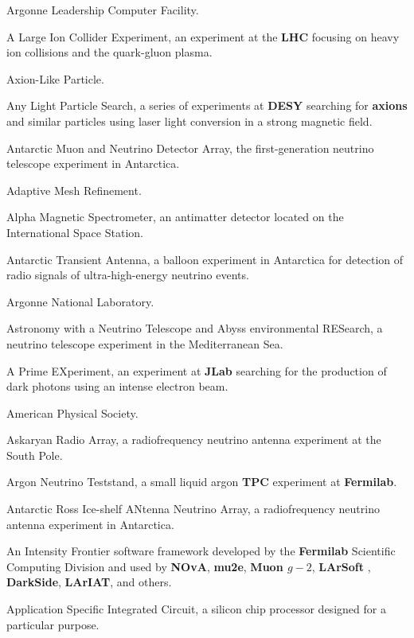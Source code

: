  Argonne Leadership Computer Facility.

  A Large Ion Collider Experiment, an experiment
at the {\bf LHC} focusing on heavy ion collisions and the quark-gluon
plasma.

  Axion-Like Particle.

  Any Light Particle Search, a series of
experiments at {\bf
  DESY} searching  for 
{\bf axions} and similar particles using laser light conversion in a strong
 magnetic field.

  Antarctic Muon and Neutrino Detector Array, the
first-generation neutrino telescope experiment in Antarctica.


 Adaptive Mesh Refinement.

  Alpha Magnetic Spectrometer, an antimatter detector located on the
International Space Station.

  Antarctic Transient Antenna,  a balloon experiment
in Antarctica for detection of radio signals of ultra-high-energy
neutrino events. 

 Argonne National Laboratory.

  Astronomy with a Neutrino Telescope and Abyss
environmental RESearch,  a neutrino telescope experiment in the
Mediterranean Sea.

  A Prime EXperiment, an experiment at {\bf JLab}
  searching for the production of dark photons using an intense
 electron beam.

  American Physical Society.

  Askaryan Radio Array, a  radiofrequency neutrino
 antenna experiment at the South Pole.

 Argon Neutrino Teststand, a small liquid argon
{\bf TPC} experiment at {\bf Fermilab}.

  Antarctic Ross Ice-shelf ANtenna Neutrino Array,
a radiofrequency neutrino antenna experiment in Antarctica.

  An Intensity Frontier software framework developed by the 
   {\bf Fermilab} Scientific Computing Division and used by {\bf
     NOvA}, {\bf mu2e}, {\bf Muon \boldmath$g-2$}, 
   {\bf LArSoft} , {\bf DarkSide}, {\bf LArIAT}, and others.

  Application Specific Integrated Circuit, a silicon
chip processor designed for a particular purpose.

